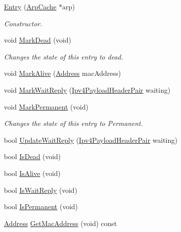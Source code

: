 \begin{DoxyCompactItemize}
\item 
\hyperlink{classns3_1_1ArpCache_1_1Entry_af53b36ad2fcf1c2416540015a8b50949}{Entry} (\hyperlink{classns3_1_1ArpCache}{Arp\+Cache} $\ast$arp)
\begin{DoxyCompactList}\small\item\em Constructor. \end{DoxyCompactList}\item 
void \hyperlink{classns3_1_1ArpCache_1_1Entry_aa403100ab9eb7be0ae7dbfa986f7d706}{Mark\+Dead} (void)
\begin{DoxyCompactList}\small\item\em Changes the state of this entry to dead. \end{DoxyCompactList}\item 
void \hyperlink{classns3_1_1ArpCache_1_1Entry_aa95c416e12733e4d37b9338210eef821}{Mark\+Alive} (\hyperlink{classns3_1_1Address}{Address} mac\+Address)
\item 
void \hyperlink{classns3_1_1ArpCache_1_1Entry_acc7c577b6f2dd4db007f596ccdb3f0da}{Mark\+Wait\+Reply} (\hyperlink{classns3_1_1ArpCache_ad018741a53ccc6cdb8b05fdd4873ef3d}{Ipv4\+Payload\+Header\+Pair} waiting)
\item 
void \hyperlink{classns3_1_1ArpCache_1_1Entry_a56daea587c2bdff382ed5b41878a7f92}{Mark\+Permanent} (void)
\begin{DoxyCompactList}\small\item\em Changes the state of this entry to Permanent. \end{DoxyCompactList}\item 
bool \hyperlink{classns3_1_1ArpCache_1_1Entry_a1cb87914637c4533d4c997b51a9735b1}{Update\+Wait\+Reply} (\hyperlink{classns3_1_1ArpCache_ad018741a53ccc6cdb8b05fdd4873ef3d}{Ipv4\+Payload\+Header\+Pair} waiting)
\item 
bool \hyperlink{classns3_1_1ArpCache_1_1Entry_a9354fb17e5dcf7dfce4dd634e0c54126}{Is\+Dead} (void)
\item 
bool \hyperlink{classns3_1_1ArpCache_1_1Entry_a48ddb408308298816e78708fc75b014b}{Is\+Alive} (void)
\item 
bool \hyperlink{classns3_1_1ArpCache_1_1Entry_a6080b6e3f9a8bca78d973dfbd33beccd}{Is\+Wait\+Reply} (void)
\item 
bool \hyperlink{classns3_1_1ArpCache_1_1Entry_a97053789aac6908284deedc8510692b7}{Is\+Permanent} (void)
\item 
\hyperlink{classns3_1_1Address}{Address} \hyperlink{classns3_1_1ArpCache_1_1Entry_a3c4d950a073eec63431071cf219d5037}{Get\+Mac\+Address} (void) const 

\end{DoxyCompactItemize}
